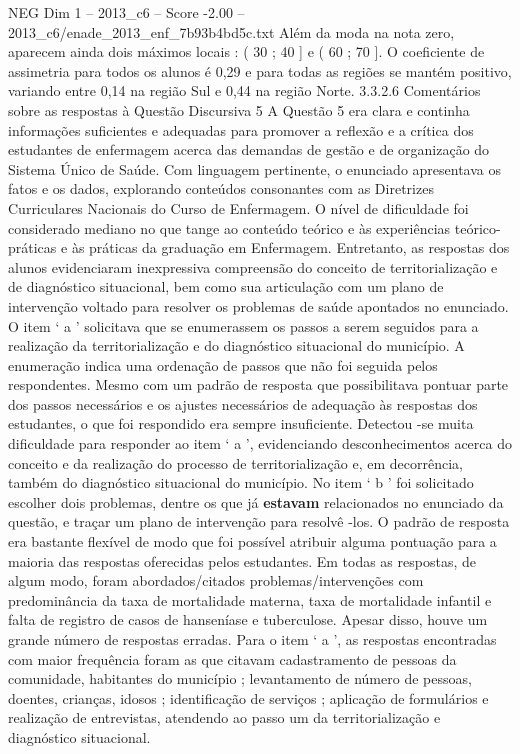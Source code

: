 \begin{textsample}{NEG Dim 1 – 2013\_c6 – Score -2.00 – 2013\_c6/enade\_2013\_enf\_7b93b4bd5c.txt}
Além da moda na nota zero, aparecem ainda dois máximos locais : ( 30 ; 40 ] e ( 60 ; 70 ].
O coeficiente de assimetria para todos os alunos é 0,29 e para todas as regiões se mantém positivo, variando entre 0,14 na região Sul e 0,44 na região Norte. 3.3.2.6 Comentários sobre as respostas à Questão Discursiva 5 A Questão 5 era clara e continha informações suficientes e adequadas para promover a reflexão e a crítica dos estudantes de enfermagem acerca das demandas de gestão e de organização do Sistema Único de Saúde.
Com linguagem pertinente, o enunciado apresentava os fatos e os dados, explorando conteúdos consonantes com as Diretrizes Curriculares Nacionais do Curso de Enfermagem.
O nível de dificuldade foi considerado mediano no que tange ao conteúdo teórico e às experiências teórico-práticas e às práticas da graduação em Enfermagem.
Entretanto, as respostas dos alunos evidenciaram inexpressiva compreensão do conceito de territorialização e de diagnóstico situacional, bem como sua articulação com um plano de intervenção voltado para resolver os problemas de saúde apontados no enunciado.
O item ‘ a ’ solicitava que se enumerassem os passos a serem seguidos para a realização da territorialização e do diagnóstico situacional do município.
A enumeração indica uma ordenação de passos que não foi seguida pelos respondentes.
Mesmo com um padrão de resposta que possibilitava pontuar parte dos passos necessários e os ajustes necessários de adequação às respostas dos estudantes, o que foi respondido era sempre insuficiente.
Detectou -se muita dificuldade para responder ao item ‘ a ’, evidenciando desconhecimentos acerca do conceito e da realização do processo de territorialização e, em decorrência, também do diagnóstico situacional do município.
No item ‘ b ’ foi solicitado escolher dois problemas, dentre os que já \textbf{estavam} relacionados no enunciado da questão, e traçar um plano de intervenção para resolvê -los.
O padrão de resposta era bastante flexível de modo que foi possível atribuir alguma pontuação para a maioria das respostas oferecidas pelos estudantes.
Em todas as respostas, de algum modo, foram abordados/citados problemas/intervenções com predominância da taxa de mortalidade materna, taxa de mortalidade infantil e falta de registro de casos de hanseníase e tuberculose.
Apesar disso, houve um grande número de respostas erradas.
Para o item ‘ a ’, as respostas encontradas com maior frequência foram as que citavam cadastramento de pessoas da comunidade, habitantes do município ; levantamento de número de pessoas, doentes, crianças, idosos ; identificação de serviços ; aplicação de formulários e realização de entrevistas, atendendo ao passo um da territorialização e diagnóstico situacional.

\end{textsample}
